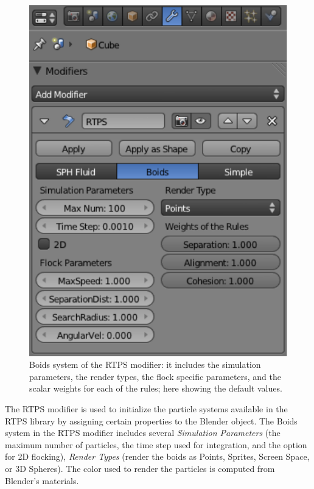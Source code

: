 \begin{figure}[htbp]
\vspace{32pt}
\begin{center}
\includegraphics[scale=0.8]{figures/modifier.pdf}
\caption{Boids system of the RTPS modifier: it includes the simulation parameters, the render types, the flock specific parameters, and the scalar weights for each of the rules; here showing the default values.}
\label{ui}
\end{center}
\end{figure}

The RTPS modifier is used to initialize the particle systems available in the RTPS library by assigning certain properties to the Blender object. The Boids system in the RTPS modifier includes several \textit{Simulation Parameters} (the maximum number of particles, the time step used for integration, and the option for 2D flocking), \textit{Render Types} (render the boids as Points, Sprites, Screen Space, or 3D Spheres). The color used to render the particles is computed  from Blender's materials.

